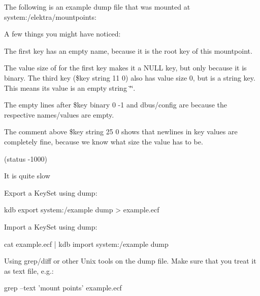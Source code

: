 The following is an example {\ttfamily dump} file that was mounted at {\ttfamily system\+:/elektra/mountpoints}\+:




A few things you might have noticed\+:


\begin{DoxyItemize}
\item The first key has an empty name, because it is the root key of this mountpoint.
\item The value size of {} for the first key makes it a {\ttfamily N\+U\+LL} key, but only because it is {\ttfamily binary}. The third key ({\ttfamily \$key string 11 0}) also has value size 0, but is a {\ttfamily string} key. This means its value is an empty string {\ttfamily \char`\"{}\char`\"{}}.
\item The empty lines after {\ttfamily \$key binary 0 -\/1} and {\ttfamily dbus/config} are because the respective names/values are empty.
\item The comment above {\ttfamily \$key string 25 0} shows that newlines in key values are completely fine, because we know what size the value has to be.
\end{DoxyItemize}

(status -\/1000)


\begin{DoxyItemize}
\item It is quite slow
\end{DoxyItemize}

Export a Key\+Set using {\ttfamily dump}\+:


\begin{DoxyCode}
kdb export system:/example dump > example.ecf
\end{DoxyCode}


Import a Key\+Set using {\ttfamily dump}\+:


\begin{DoxyCode}
cat example.ecf | kdb import system:/example dump
\end{DoxyCode}


Using grep/diff or other Unix tools on the dump file. Make sure that you treat it as text file, e.\+g.\+:


\begin{DoxyCode}
grep --text 'mount points' example.ecf
\end{DoxyCode}
 